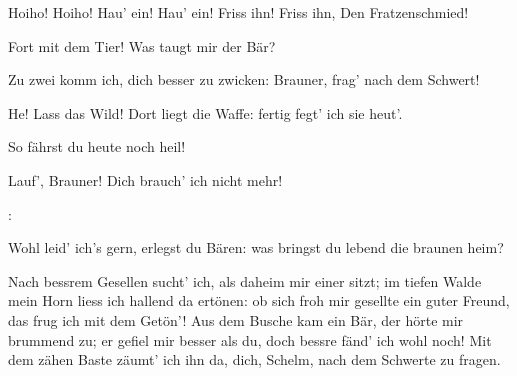 \begin{drama}

\Siegfriedspeaks


Hoiho! Hoiho!
Hau' ein! Hau' ein!
Friss ihn! Friss ihn,
Den Fratzenschmied!


\Mimespeaks

Fort mit dem Tier!
Was taugt mir der Bär?

\Siegfriedspeaks

Zu zwei komm ich,
dich besser zu zwicken:
Brauner, frag' nach dem Schwert!

\Mimespeaks

He! Lass das Wild!
Dort liegt die Waffe:
fertig fegt' ich sie heut'.

\Siegfriedspeaks

So fährst du heute noch heil!


Lauf', Brauner!
Dich brauch' ich nicht mehr!


\Mimespeaks:


Wohl leid' ich's gern,
erlegst du Bären:
was bringst du lebend
die braunen heim?

\Siegfriedspeaks


Nach bessrem Gesellen sucht' ich,
als daheim mir einer sitzt;
im tiefen Walde mein Horn
liess ich hallend da ertönen:
ob sich froh mir gesellte
ein guter Freund,
das frug ich mit dem Getön'!
Aus dem Busche kam ein Bär,
der hörte mir brummend zu;
er gefiel mir besser als du,
doch bessre fänd' ich wohl noch!
Mit dem zähen Baste
zäumt' ich ihn da,
dich, Schelm, nach dem Schwerte zu fragen.


\Mimespeaks


\end{drama}
